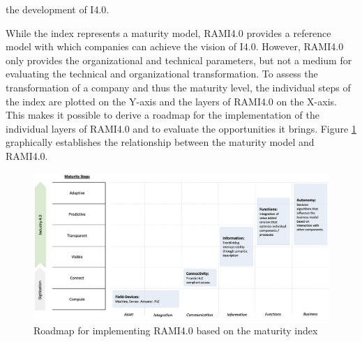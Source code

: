 the development of \ac{I4.0}. 

While the index represents a maturity model, \ac{RAMI4.0} provides a reference model with which companies can achieve the vision of \ac{I4.0}. However, \ac{RAMI4.0} only provides the organizational and technical parameters, but not a medium for evaluating the technical and organizational transformation. To assess the transformation of a company and thus the maturity level, the individual steps of the index are plotted on the Y-axis and the layers of \ac{RAMI4.0} on the X-axis. This makes it possible to derive a roadmap for the implementation of the individual layers of \ac{RAMI4.0} and to evaluate the opportunities it brings. Figure \ref{fig:roadmap} graphically establishes the relationship between the maturity model and \ac{RAMI4.0}.

\begin{figure}[h]
\centering
\includegraphics[scale=0.25]{content/pictures/rami_roadmap.png}
\caption{Roadmap for implementing RAMI4.0 based on the maturity index}
\label{fig:roadmap}
\end{figure}

